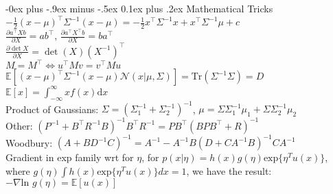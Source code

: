\documentclass[9pt,landscape]{article}
\makeatletter
\renewcommand{\section}{\@startsection{section}{1}{0mm}%
                                {-0ex plus -.9ex minus -.5ex}%
                                {0.1ex plus .2ex}%
                                {\normalfont\scriptsize\bfseries}}
\makeatother
\begin{document}
\begin{multicols}{3}
\section{Mathematical Tricks}
\vspace{-.5em}
$-\frac{1}{2}(x-\mu)^\top\Sigma^{-1}(x-\mu) = -\frac{1}{2}x^\top \Sigma^{-1}x + x^\top \Sigma^{-1} \mu + c$\\
$\frac{\partial a^\top X b}{\partial X} = ab^\top$,
$\frac{\partial a^\top X^\top b}{\partial X} = ba^\top$\\
$\frac{\partial \det X}{\partial X} = \det (X) (X^{-1})^\top$ \\
$M = M^\top \iff u^\top M v = v^\top M u$\\
$\mathbb{E}[(x-\mu)^\top \Sigma^{-1} (x-\mu)\mathcal{N}(x|\mu, \Sigma)] = \mathrm{Tr}(\Sigma^{-1}\Sigma) = D$\\
$\mathbb{E} [x] = \int^\infty_{-\infty}x f(x)\mathrm{d}x$\\
Product of Gaussians: $\Sigma = (\Sigma_1^{-1} + \Sigma_2^{-1})^{-1}$, $\mu = \Sigma \Sigma_1^{-1} \mu_1 + \Sigma \Sigma_2^{-1} \mu_2$\\
Other: $(P^{-1}+B^\top R^{-1}B)^{-1}B^\top R^{-1} = PB^\top (BPB^\top + R)^{-1}$\\
Woodbury: $(A+BD^{-1}C)^{-1} = A^{-1} - A^{-1}B(D+CA^{-1}B)^{-1}CA^{-1}$\\
Gradient in exp family wrt for $\eta$, for $p(x|\eta) = h(x)g(\eta)\text{exp}\{\eta^Tu(x)\}$, where $g(\eta)\int h(x) \text{exp}\{\eta^Tu(x)\} dx = 1$, we have the result:$- \nabla \text{ln } g(\eta) = \mathbb{E}[u(x)]$
\end{multicols}
\end{document}
